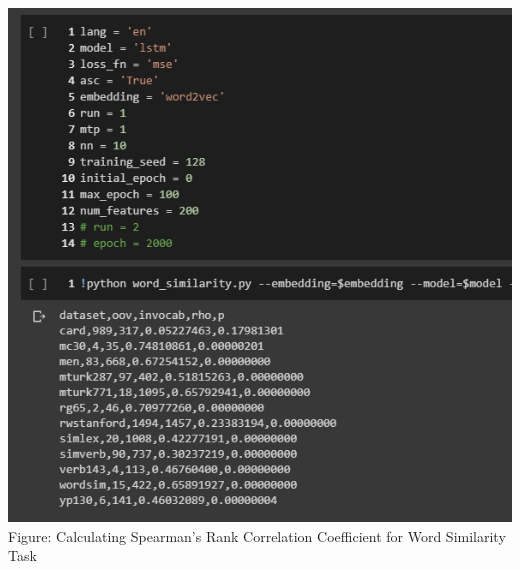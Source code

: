 \documentclass[a4paper,12pt]{report}
\begin{document}
\includegraphics[width=.7\linewidth]{images/calculate_wordsim.jpg}\\
Figure: Calculating Spearman's Rank Correlation Coefficient for Word
Similarity Task



\end{document}

